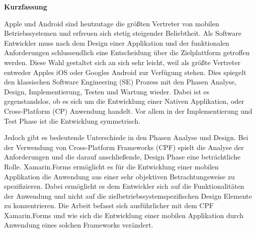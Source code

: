 %
%
% 
% 



\cleardoublepage

\begin{center}
{\Large\bfseries Kurzfassung}
\end{center}

Apple und Android sind heutzutage die größten Vertreter von mobilen Betriebssystemen und erfreuen sich stetig steigender Beliebtheit. Als Software Entwickler muss nach dem Design einer Applikation und der funktionalen Anforderungen schlussendlich eine Entscheidung über die Zielplattform getroffen werden. Diese Wahl gestaltet sich an sich sehr leicht, weil als größte Vertreter entweder Apples iOS oder Googles Android zur Verfügung stehen. Dies spiegelt den klassischen Software Engineering (SE) Prozess mit den Phasen Analyse, Design, Implementierung, Testen und Wartung wieder. Dabei ist es gegenstandslos, ob es sich um die Entwicklung einer Nativen Applikation, oder Cross-Platform (CP) Anwendung handelt. Vor allem in der Implementierung und Test Phase ist die Entwicklung symmetrisch.

Jedoch gibt es bedeutende Unterschiede in den Phasen Analyse und Design. Bei der Verwendung von Cross-Platform Frameworks (CPF) spielt die Analyse der Anforderungen und die darauf anschließende, Design Phase eine beträchtliche Rolle. Xamarin.Forms ermöglicht es für die Entwicklung einer mobilen Applikation die Anwendung aus einer sehr objektiven Betrachtungsweise zu spezifizieren. Dabei ermöglicht es dem Entwickler sich auf die Funktionalitäten der Anwendung und nicht auf die zielbetriebssystemspezifischen Design Elemente zu konzentrieren. Die Arbeit befasst sich ausführlicher mit dem CPF Xamarin.Forms und wie sich die Entwicklung einer mobilen Applikation durch Anwendung eines solchen Frameworks verändert.


\cleardoublepage

